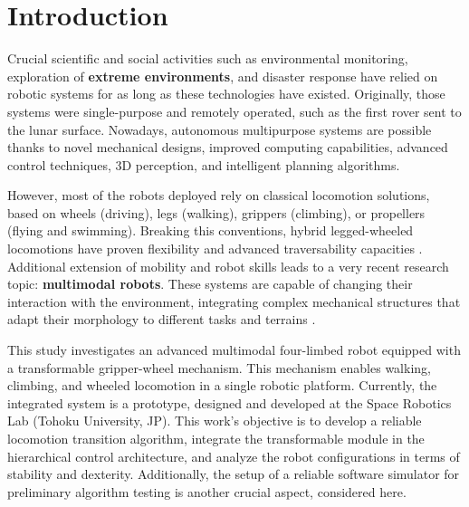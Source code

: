 \documentclass[11pt,a4paper,twocolumn]{article}
\begin{document}



\section{Introduction}
\label{sec:introduction}

Crucial scientific and social activities such as environmental monitoring, exploration of \textbf{extreme environments}, and disaster response have relied on robotic systems for as long as these technologies have existed.  
Originally, those systems were single-purpose and remotely operated, such as the first rover sent to the lunar surface. Nowadays, autonomous multipurpose systems are possible thanks to novel mechanical designs, improved computing capabilities,  advanced control techniques, 3D perception, and intelligent planning algorithms. 

However, most of the robots deployed rely on classical locomotion solutions, based on wheels (driving), legs (walking), grippers (climbing), or propellers (flying and swimming). Breaking this conventions, hybrid legged-wheeled locomotions have proven flexibility and advanced traversability capacities \cite{ANYmalWHEEL}.
Additional extension of mobility and robot skills leads to a very recent research topic: \textbf{multimodal robots}. These systems are capable of changing their interaction with the environment, integrating complex mechanical structures that adapt their morphology to different tasks and terrains \cite{WAREC1}.

This study investigates an advanced multimodal four-limbed robot equipped with a transformable gripper-wheel mechanism. This mechanism enables walking, climbing, and wheeled locomotion in a single robotic platform. 
Currently, the integrated system is a prototype, designed and developed at the Space Robotics Lab (Tohoku University, JP). This work's objective is to develop a reliable locomotion transition algorithm, integrate the transformable module in the hierarchical control architecture, and analyze the robot configurations in terms of stability and dexterity. Additionally, the setup of a reliable software simulator for preliminary algorithm testing is another crucial aspect, considered here. 
\end{document}
